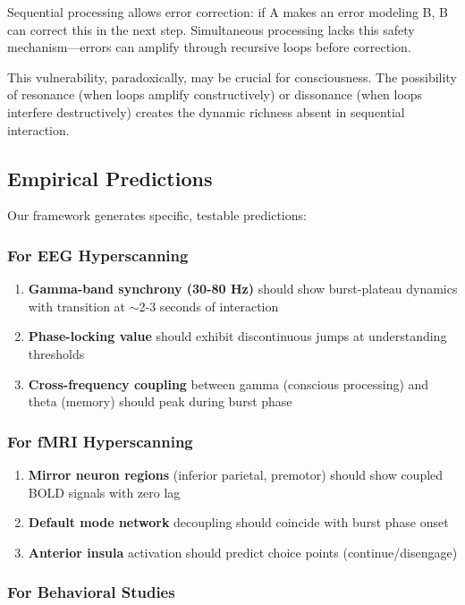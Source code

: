 \documentclass[12pt]{article}
\begin{document}
Sequential processing allows error correction: if A makes an error modeling B, B can correct this in the next step. Simultaneous processing lacks this safety mechanism—errors can amplify through recursive loops before correction.

This vulnerability, paradoxically, may be crucial for consciousness. The possibility of resonance (when loops amplify constructively) or dissonance (when loops interfere destructively) creates the dynamic richness absent in sequential interaction.

\subsection{Empirical Predictions}

Our framework generates specific, testable predictions:

\subsubsection{For EEG Hyperscanning}

\begin{enumerate}
\item \textbf{Gamma-band synchrony (30-80 Hz)} should show burst-plateau dynamics with transition at $\sim$2-3 seconds of interaction
\item \textbf{Phase-locking value} should exhibit discontinuous jumps at understanding thresholds
\item \textbf{Cross-frequency coupling} between gamma (conscious processing) and theta (memory) should peak during burst phase
\end{enumerate}

\subsubsection{For fMRI Hyperscanning}

\begin{enumerate}
\item \textbf{Mirror neuron regions} (inferior parietal, premotor) should show coupled BOLD signals with zero lag
\item \textbf{Default mode network} decoupling should coincide with burst phase onset
\item \textbf{Anterior insula} activation should predict choice points (continue/disengage)
\end{enumerate}

\subsubsection{For Behavioral Studies}
\end{document}
